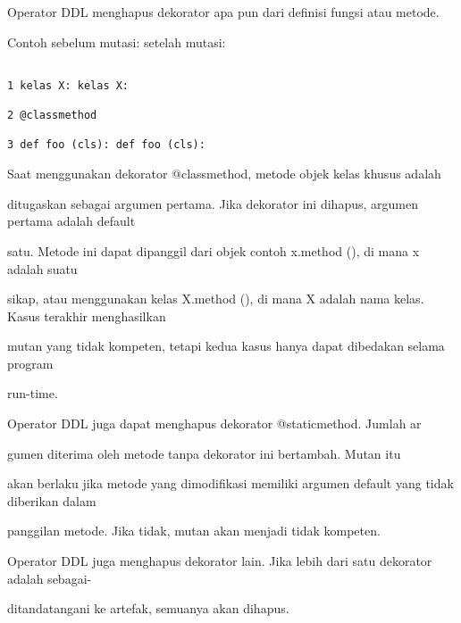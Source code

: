 \documentclass[12pt,a4paper]{article}
\begin{document}
Operator DDL menghapus dekorator apa pun dari definisi fungsi atau metode.

Contoh sebelum mutasi: setelah mutasi:

\begin{verbatim}

1 kelas X: kelas X:

2 @classmethod

3 def foo (cls): def foo (cls):

\end{verbatim}

Saat menggunakan dekorator @classmethod, metode objek kelas khusus adalah

ditugaskan sebagai argumen pertama. Jika dekorator ini dihapus, argumen pertama adalah default

satu. Metode ini dapat dipanggil dari objek contoh x.method (), di mana x adalah suatu

sikap, atau menggunakan kelas X.method (), di mana X adalah nama kelas. Kasus terakhir menghasilkan

mutan yang tidak kompeten, tetapi kedua kasus hanya dapat dibedakan selama program

run-time.

Operator DDL juga dapat menghapus dekorator @staticmethod. Jumlah ar

gumen diterima oleh metode tanpa dekorator ini bertambah. Mutan itu

akan berlaku jika metode yang dimodifikasi memiliki argumen default yang tidak diberikan dalam

panggilan metode. Jika tidak, mutan akan menjadi tidak kompeten.

Operator DDL juga menghapus dekorator lain. Jika lebih dari satu dekorator adalah sebagai-

ditandatangani ke artefak, semuanya akan dihapus.
\end{document}
